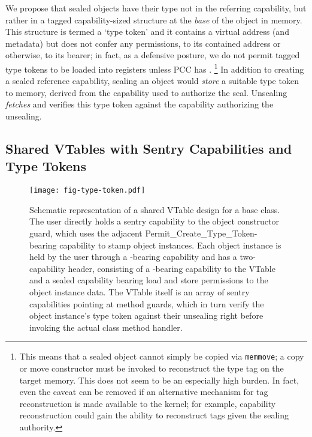 We propose that sealed objects have their type not in the referring
capability, but rather in a tagged capability-sized structure at the
\emph{base} of the object in memory.  This structure is termed a `type
token' and it contains a virtual address (and metadata) but does not confer
any permissions, to its contained address or otherwise, to its bearer; in
fact, as a defensive posture, we do not permit tagged type tokens to be
loaded into registers unless PCC has \cappermASR.%
%
\footnote{This means that a sealed object cannot simply be copied via
\texttt{memmove}; a copy or move constructor must be invoked to reconstruct
the type tag on the target memory.  This does not seem to be an especially
high burden.  In fact, even the \cappermASR caveat can
be removed if an alternative mechanism for tag reconstruction is made
available to the kernel; for example, capability reconstruction
could gain the ability to
reconstruct tags given the sealing authority.}
%
In addition to creating a sealed reference capability, sealing an object
would \emph{store} a suitable type token to memory, derived from the
capability used to authorize the seal.  Unsealing \emph{fetches} and
verifies this type token against the capability authorizing the unsealing.

\subsection{Shared VTables with Sentry Capabilities and Type Tokens} %
\label{app:exp:typetoken:vt}

\begin{figure}[htb] %
  \centering
  \texttt{[image: fig-type-token.pdf]}

  \caption{Schematic representation of a shared VTable design for a base class.
  The user directly holds a sentry capability to the object constructor guard,
  which uses the adjacent Permit\_Create\_Type\_Token-bearing capability to
  stamp object instances.  Each object instance is held by the user through a
  \cappermLC-bearing capability and has a two-capability header,
  consisting of a \cappermLC-bearing capability to the VTable and
  a sealed capability bearing load and store permissions to the object instance
  data.  The VTable itself is an array of sentry capabilities pointing at
  method guards, which in turn verify the object instance's type token against
  their unsealing right before invoking the actual class method handler.}
  \label{fig:app:exp:typetoken:vt}

\end{figure} %

